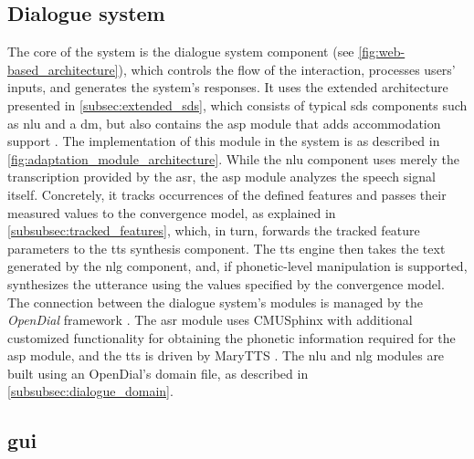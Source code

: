 \subsection{Dialogue system}
\label{subsec:dialogue_system}

The core of the system is the dialogue system component (see \cref{fig:web-based_architecture}), which controls the flow of the interaction, processes users' inputs, and generates the system's responses.
It uses the extended architecture presented in \cref{subsec:extended_sds}, which consists of typical \ac{sds} components such as \ac{nlu} and a \ac{dm}, but also contains the \ac{asp} module that adds accommodation support \citep{Raveh2017SemDial}.
The implementation of this module in the system is as described in \cref{fig:adaptation_module_architecture}.
While the \ac{nlu} component uses merely the transcription provided by the \ac{asr}, the \ac{asp} module analyzes the speech signal itself.
Concretely, it tracks occurrences of the defined features and passes their measured values to the convergence model, as explained in \cref{subsubsec:tracked_features}, which, in turn, forwards the tracked feature parameters to the \ac{tts} synthesis component.
The \ac{tts} engine then takes the text generated by the \ac{nlg} component, and, if phonetic-level manipulation is supported, synthesizes the utterance using the values specified by the convergence model.
The connection between the dialogue system's modules is managed by the \emph{OpenDial} framework \citep{Lison2016opendial, Lison2015developing}.
The \ac{asr} module uses CMUSphinx \citep{Lamere2003sphinx} with additional customized functionality for obtaining the phonetic information required for the \ac{asp} module, and the \ac{tts} is driven by MaryTTS \citep{LeMaguer2017uprooted, Schroeder2003mary}.
The \ac{nlu} and \ac{nlg} modules are built using an OpenDial's domain file, as described in \cref{subsubsec:dialogue_domain}.

\subsection{\Acl{gui}}
\label{subsec:graphical_user_interface}



